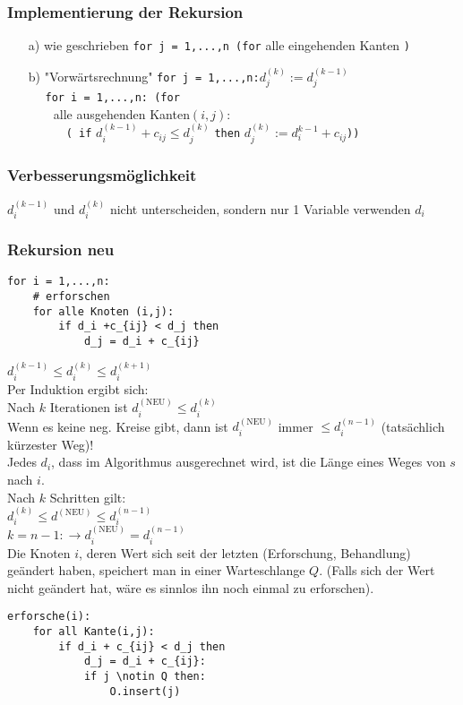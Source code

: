 \subsubsection{Implementierung der Rekursion}
\begin{enumerate}
\item[a)] wie geschrieben \lstinline!for j = 1,...,n (for! alle eingehenden Kanten \lstinline!)!
\item[b)] "Vorwärtsrechnung" \lstinline!for j = 1,...,n:!$d_j^{(k)} := d_j^{(k-1)}$\\
$\quad$ \lstinline!for i = 1,...,n: (for! \\$\quad\quad$alle ausgehenden Kanten$(i,j)$:\\$\quad\quad\quad$\lstinline!( if! $d_i^{(k-1)}+c_{ij} \leq d_j^{(k)}$ \lstinline!then! $d_j^{(k)} := d_i^{k-1}+c_{ij}$\lstinline!))!
\end{enumerate}
\subsubsection{Verbesserungsmöglichkeit}
$d_i^{(k-1)}$ und $d_i^{(k)}$ nicht unterscheiden, sondern nur 1 Variable verwenden $d_i$\\
\subsubsection{Rekursion neu}
\begin{lstlisting}
for i = 1,...,n:
	# erforschen
	for alle Knoten (i,j):
		if d_i +c_{ij} < d_j then
			d_j = d_i + c_{ij}
\end{lstlisting}
$d_i^{(k-1)} \leq d_i^{(k)} \leq d_i^{(k+1)}$\\
Per Induktion ergibt sich:\\
Nach $k$ Iterationen ist $d_i^{(\text{NEU})} \leq d_i^{(k)}$\\
Wenn es keine neg. Kreise gibt, dann ist $d_i^{(\text{NEU})}$ immer $\leq d_i^{(n-1)}$ (tatsächlich kürzester Weg)!\\
Jedes $d_i$, dass im Algorithmus ausgerechnet wird, ist die Länge eines Weges von $s$ nach $i$.\\
Nach $k$ Schritten gilt:\\
$d_i^{(k)} \leq d^{(\text{NEU})} \leq d_i^{(n-1)}$\\
$k=n-1: \rightarrow d_i^{(\text{NEU})} = d_i^{(n-1)}$\\
Die Knoten $i$, deren Wert sich seit der letzten (Erforschung, Behandlung) geändert haben, speichert man in einer Warteschlange $Q$. (Falls sich der Wert nicht geändert hat, wäre es sinnlos ihn noch einmal zu erforschen).\\
\begin{lstlisting}[mathescape]
erforsche(i):
	for all Kante(i,j):
		if d_i + c_{ij} < d_j then
			d_j = d_i + c_{ij}:
			if j \notin Q then:
				O.insert(j)
\end{lstlisting}

